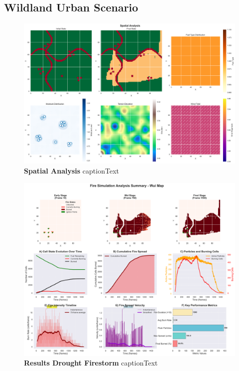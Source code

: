 \subsection{Wildland Urban Scenario}
\begin{figure}[H]
	\centering
	\includegraphics[width=\textwidth]{media/spatial_analysis_wui.png}
	\caption{
		\textbf{Spatial Analysis}
		captionText
	}
	\label{fig:spatial_wui}
\end{figure}

\begin{figure}[H]
	\centering
	\includegraphics[width=\textwidth]{media/report_summary_wui.png}
	\caption{
		\textbf{Results Drought Firestorm}
		captionText
	}
	\label{fig:res_wui}
\end{figure}

